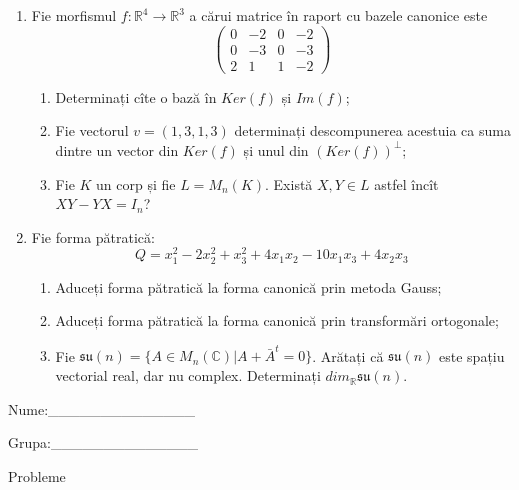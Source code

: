 \documentclass{article}
\begin{document}
\begin{enumerate}
 \item Fie morfismul $f:\mathbb{R}^4 \to \mathbb{R}^3$ a cărui matrice în raport cu bazele canonice este
$$\begin{pmatrix}
0&-2&0&-2\\
0&-3&0&-3\\
2&1&1&-2
\end{pmatrix}$$

\begin{enumerate}
\item Determinați cîte o bază în $Ker(f)$ și $Im(f)$;
\item Fie vectorul $v=(1,3,1,3)$ determinați descompunerea acestuia ca suma dintre un vector din $Ker(f)$ și unul din $(Ker(f))^\perp$;
\item Fie $K$ un corp și fie $L=M_n(K)$. Există $X,Y \in L$ astfel încît $XY-YX=I_n$?  
\end{enumerate}
\item Fie forma pătratică:
$$Q= x_1^2-2x_2^2+x_3^2+4x_1x_2-10x_1x_3+4x_2x_3$$

\begin{enumerate}
\item Aduceți forma pătratică la forma canonică prin metoda Gauss;
\item Aduceți forma pătratică la forma canonică prin transformări ortogonale;
\item Fie $\mathfrak{su}(n)=\{ A \in M_n(\mathbb{C}) | A+\bar{A}^t=0\}$. Arătați că $\mathfrak{su}(n)$ este spațiu vectorial real, dar nu complex.
Determinați $dim_{\mathbb{R}}\mathfrak{su}(n)$.
\end{enumerate}
\end{enumerate}
\newpage
\begin{flushright}
Nume:\_\_\_\_\_\_\_\_\_\_\_\_\_\_
 
 
Grupa:\_\_\_\_\_\_\_\_\_\_\_\_\_\_
\end{flushright}
\begin{center}
\vspace{2cm}
{\Large Probleme}
\vspace{2cm}
\end{center}
\end{document}

